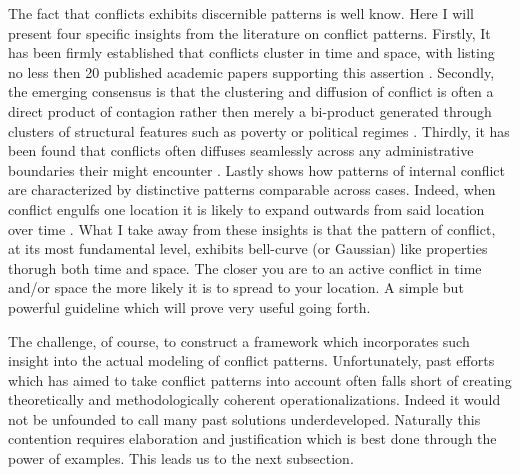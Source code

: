 \documentclass[a4paper]{article}
\begin{document}

The fact that conflicts exhibits discernible patterns is well know. Here I will present four specific insights from the literature on conflict patterns. Firstly, It has been firmly established that conflicts cluster in time and space, with \cite{crost2015conflict} listing no less then 20 published academic papers supporting this assertion \citep[15]{crost2015conflict}. Secondly, the emerging consensus is that the clustering and diffusion of conflict is often a direct product of contagion rather then merely a bi-product generated through clusters of structural features such as poverty or political regimes \citep{buhaug2008contagion,schutte2011diffusion,crost2015conflict,bara_2017}. Thirdly, it has been found that conflicts often diffuses seamlessly across any administrative boundaries their might encounter \cite[442-443]{ol2010afghanistan}. Lastly \cite{schutte2011diffusion} shows how patterns of internal conflict are characterized by distinctive patterns comparable across cases. Indeed, when conflict engulfs one location it is likely to expand outwards from said location over time \citep[151]{schutte2011diffusion}. What I take away from these insights is that the pattern of conflict, at its most fundamental level, exhibits bell-curve (or Gaussian) like properties thorugh both time and space. The closer you are to an active conflict in time and/or space the more likely it is to spread to your location. A simple but powerful guideline which will prove very useful going forth.\par

The challenge, of course, to construct a framework which incorporates such insight into the actual modeling of conflict patterns. Unfortunately, past efforts which has aimed to take conflict patterns into account often falls short of creating theoretically and methodologically coherent operationalizations. Indeed it would not be unfounded to call many past solutions underdeveloped. Naturally this contention requires elaboration and justification which is best done through the power of examples. This leads us to the next subsection.\par
\end{document}
